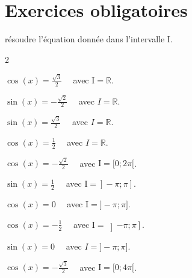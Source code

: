 \documentclass[11pt,a4paper]{article}  %
\begin{document}
	\graphicspath{{images/}}
	
	\begin{center}
		
		
	\end{center}

\section*{Exercices obligatoires}

\exercice{}

résoudre l'équation donnée dans l'intervalle I.

\begin{multicols}{2}
	\begin{enumMet}
		\item $\cos (x)=\frac{\sqrt{3}}{2} \quad$ avec $\mathrm{I}=\mathbb{R}$.
		\item $\sin (x)=-\frac{\sqrt{2}}{2} \quad$ avec $I=\mathbb{R}$.
		\item $\sin (x)=\frac{\sqrt{3}}{2} \quad$ avec $I=\mathbb{R}$.
		\item $\cos (x)=\frac{1}{2} \quad$ avec $I=\mathbb{R}$.
		\item $\cos (x)=-\frac{\sqrt{2}}{2} \quad$ avec $\mathrm{I}=[0 ; 2 \pi[$.
		\item $\sin (x)=\frac{1}{2} \quad$ avec $\left.\left.\mathrm{I}=\right]-\pi ; \pi\right]$.
		\item $\cos (x)=0 \quad$ avec $\mathrm{I}=]-\pi ; \pi]$.
		\item $\cos (x)=-\frac{1}{2} \quad$ avec $\mathrm{I}=\left]-\pi ; \pi\right]$.
		\item $\sin (x)=0 \quad$ avec $I=]-\pi ; \pi]$.
		\item $\cos (x)=-\frac{\sqrt{3}}{2} \quad$ avec $\mathrm{I}=[0 ; 4 \pi[$.
	\end{enumMet}
\end{multicols}

\end{document}
